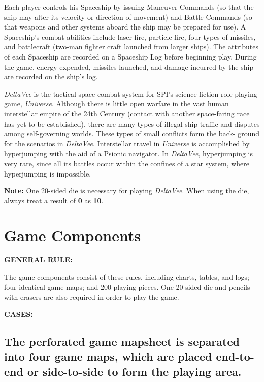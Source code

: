 Each player controls his Spaceship by issuing Maneuver Commands (so
that the ship may alter its velocity or direction of movement) and
Battle Commands (so that weapons and other systems aboard the ship may
be prepared for use). A Spaceship's combat abilities include laser
fire, particle fire, four types of missiles, and battlecraft (two-man
fighter craft launched from larger ships). The attributes of each
Spaceship are recorded on a Spaceship Log before beginning play.
During the game, energy expended, missiles launched, and damage
incurred by the ship are recorded on the ship's log.

\emph{DeltaVee} is the tactical space combat system for SPI's science
fiction role-playing game, \emph{Universe}. Although there is little
open warfare in the vast human interstellar empire of the 24th Century
(contact with another space-faring race has yet to be established),
there are many types of illegal ship traffic and disputes among
self-governing worlds. These types of small conflicts form the back-
ground for the scenarios in \emph{DeltaVee}. Interstellar travel in
\emph{Universe} is accomplished by hyperjumping with the aid of a
Psionic navigator. In \emph{DeltaVee}, hyperjumping is very rare,
since all its battles occur within the confines of a star system,
where hyperjumping is impossible.

\textbf{Note:} One 20-sided die is necessary for playing
\emph{DeltaVee}. When using the die, always treat a result of
\textbf{0} as \textbf{10}.


\section{Game Components}
\label{sec:game-components}

\noindent\textbf{GENERAL RULE:}

The game components consist of these rules, including charts, tables,
and logs; four identical game maps; and 200 playing pieces.  One
20-sided die and pencils with erasers are also required in order to
play the game.

\medskip

\noindent\textbf{CASES:}

\subsection[Game Map]{The perforated game mapsheet is separated into
  four game maps, which 
  are placed end-to-end or side-to-side to form the playing area.}
\label{sec:game-map}


